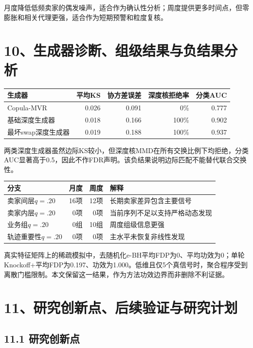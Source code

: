 \documentclass[UTF8,12pt,a4paper]{ctexart}
\begin{document}
月度降低低频卖家的偶发噪声，适合作为确认性分析；周度提供更多时间点，但零膨胀和相关代理更强，适合作为短期预警和粒度复核。

\newpage
\section*{10、生成器诊断、组级结果与负结果分析}

\begin{center}
\scriptsize
\begin{tabular}{lrrrr}
\toprule
生成器 & 平均KS & 协方差误差 & 深度核拒绝率 & 分类AUC\\
\midrule
Copula-MVR & 0.026 & 0.091 & 0\% & 0.777\\
基础深度生成器 & 0.018 & 0.166 & 100\% & 0.902\\
最坏swap深度生成器 & 0.019 & 0.188 & 100\% & 0.937\\
\bottomrule
\end{tabular}
\end{center}

两类深度生成器虽然边际KS较小，但深度核MMD在所有交换比例下均拒绝，分类AUC显著高于0.5，因此不作FDR声明。该负结果说明边际匹配不能替代联合交换性。

\begin{center}
\scriptsize
\begin{tabular}{lrrp{6.0cm}}
\toprule
分支 & 月度 & 周度 & 解释\\
\midrule
卖家间层$q=.20$ & 16项 & 12项 & 长期卖家差异包含主要信号\\
卖家内层$q=.20$ & 0项 & 0项 & 当前序列不足以支持严格动态发现\\
业务组$q=.20$ & 0组 & 10组 & 周度组级信息更强\\
轨迹重要性$q=.20$ & 0项 & 0项 & 主水平未恢复非线性发现\\
\bottomrule
\end{tabular}
\end{center}

真实特征矩阵上的稀疏模拟中，去随机化e-BH平均FDP为0、平均功效为0；单轮Knockoff+平均FDP为0.197、功效为1.000。低维且仅5个真信号时，聚合程序受到离散门槛限制。本文保留这一结果，作为方法功效边界而非删除不利证据。

\newpage
\section*{11、研究创新点、后续验证与研究计划}
\enlargethispage{2\baselineskip}

\subsection*{11.1 研究创新点}
\end{document}

